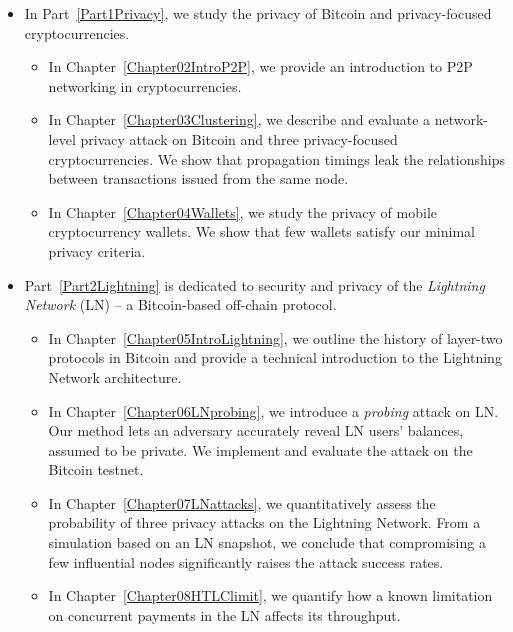 \begin{itemize}
	\item 
	In Part~\ref{Part1Privacy}, we study the privacy of Bitcoin and privacy-focused cryptocurrencies.
	\begin{itemize}
		\item
	In Chapter~\ref{Chapter02IntroP2P}, we provide an introduction to P2P networking in cryptocurrencies.
		\item
	In Chapter~\ref{Chapter03Clustering}, we describe and evaluate a network-level privacy attack on Bitcoin and three privacy-focused cryptocurrencies.
	We show that propagation timings leak the relationships between transactions issued from the same node.
		\item
	In Chapter~\ref{Chapter04Wallets}, we study the privacy of mobile cryptocurrency wallets.
	We show that few wallets satisfy our minimal privacy criteria.
	\end{itemize}

	\item
	Part~\ref{Part2Lightning} is dedicated to security and privacy of the \textit{Lightning Network} (LN) -- a Bitcoin-based off-chain protocol.
	\begin{itemize}
		\item 
	In Chapter~\ref{Chapter05IntroLightning}, we outline the history of layer-two protocols in Bitcoin and provide a technical introduction to the Lightning Network architecture.
		\item
	In Chapter~\ref{Chapter06LNprobing}, we introduce a \textit{probing} attack on LN\@.
	Our method lets an adversary accurately reveal LN users' balances, assumed to be private.
	We implement and evaluate the attack on the Bitcoin testnet.
		\item
	In Chapter~\ref{Chapter07LNattacks}, we quantitatively assess the probability of three privacy attacks on the Lightning Network.
	From a simulation based on an LN snapshot, we conclude that compromising a few influential nodes significantly raises the attack success rates.
		\item
	In Chapter~\ref{Chapter08HTLClimit}, we quantify how a known limitation on concurrent payments in the LN affects its throughput.
	\end{itemize}


\end{itemize}
